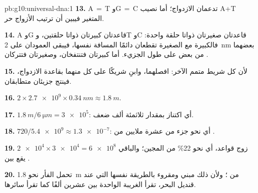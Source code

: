 \begin{solution}{pb:g10:universal-dna:1}
\textbf{13.} A$\,=\,$T وG$\,=\,$C تدعمان الازدواج؛ أما نصيب A+T
المتغير فيبين أن ترتيب الأزواج حر.

\textbf{14.} A وG قاعدتان كبيرتان ذواتا حلقتين، وT وC قاعدتان صغيرتان
ذواتا حلقة واحدة: فالكبيرة مع الصغيرة تقطعان دائمًا المسافة نفسها،
فيبقى العمودان على \qty{2}{nm} بعضهما من بعض على طول الجزيء. أما
كبيرتان فتنتفخان، وصغيرتان فتتركان .

\textbf{15.} لأن كل شريط متمم الآخر: افصلهما، وابنِ شريكًا على كل
منهما بقاعدة الازدواج، فينتج جزيئان متطابقان.

\textbf{16.} $2 \times \num{2.7e9} \times \qty{0.34}{nm} \approx
\qty{1.8}{m}$.

\textbf{17.} $\qty{1.8}{m} / \qty{6}{\micro m} = \num{3e5}$: أي
اكتناز بمقدار ثلاثمئة ألف ضعف.

\textbf{18.} $720 / \num{5.4e9} \approx \num{1.3e-7}$: أي نحو جزء من
عشرة ملايين من  .

\textbf{19.} $\num{2e4} \times \num{3e4} = \num{6e8}$ زوج قواعد، أي
نحو 22\% من المجين؛ والباقي يقع بين .

\textbf{20.} تحمل  الفأر نحو \qty{1.8}{m} من ؛ ولأن ذلك 
مبني ومقروء بالطريقة نفسها التي عند قنديل البحر، تقرأ 
الغريبة الواحدة بين عشرين ألفًا كما تقرأ سائرها.
\end{solution}
